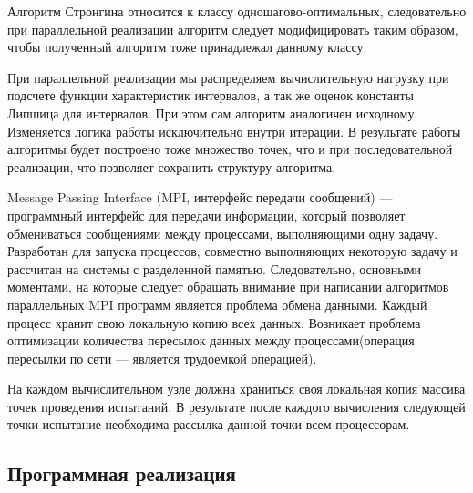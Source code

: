 \documentclass{article}
\begin{document}
\par Алгоритм Стронгина относится к классу одношагово-оптимальных, следовательно при параллельной реализации алгоритм следует модифицировать таким образом, чтобы полученный алгоритм тоже принадлежал данному классу.
\par При параллельной реализации мы распределяем вычислительную нагрузку при подсчете функции характеристик интервалов, а так же оценок константы Липшица для интервалов. При этом сам алгоритм аналогичен исходному. Изменяется логика работы исключительно внутри итерации. В результате работы алгоритмы будет построено тоже множество точек, что и при последовательной реализации, что позволяет сохранить структуру алгоритма.
\par Message Passing Interface (MPI, интерфейс передачи сообщений) — программный интерфейс для передачи информации, который позволяет обмениваться сообщениями между процессами, выполняющими одну задачу. Разработан для запуска процессов, совместно выполняющих некоторую задачу и рассчитан на системы с разделенной памятью. Следовательно, основными моментами, на которые следует обращать внимание при написании алгоритмов параллельных MPI программ является проблема обмена данными. Каждый процесс хранит свою локальную копию всех данных. Возникает проблема оптимизации количества пересылок данных между процессами(операция пересылки по сети — является трудоемкой операцией).
\par На каждом вычислительном узле должна храниться своя локальная копия массива точек проведения испытаний. В результате после каждого вычисления следующей точки испытание необходима рассылка данной точки всем процессорам. 
\newpage

\subsection*{Программная реализация}
\end{document}
